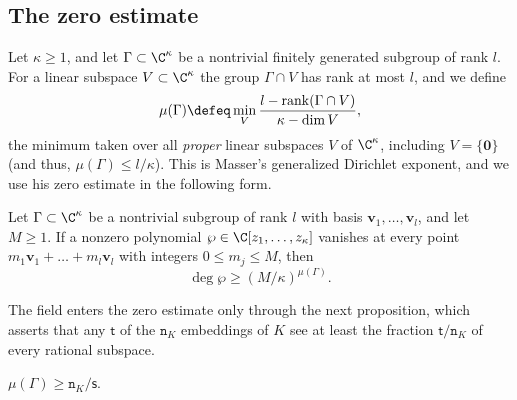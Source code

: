 \documentclass[11pt, reqno, twoside, letterpaper]{amsart}
\newcommand{\vv}{\mathbf{v}}
\newcommand{\vzero}{\mathbf{0}}
\DeclareMathOperator{\rk}{rank}
\newcommand{\dK}{{\mathtt{n}_K}}
\newcommand{\Kf}{K}
\newcommand{\lat}{\Gamma}
\newcommand{\poly}{\wp}
\newcommand{\nS}{\mathsf{s}}
\newcommand{\nT}{\mathsf{t}}
\begin{document}
\subsection{The zero estimate}

Let $\kappa\ge 1$, and let $\lat\subset\C^{\kappa}$ be a nontrivial
finitely generated subgroup of rank $l$. For a linear subspace
$V\subset\C^{\kappa}$ the group $\lat\cap V$ has rank at most $l$, and
we define
\[
\mu(\lat)\defeq\min_{V}\frac{l-\rk(\lat\cap V)}{\kappa-\dim V},
\]
the minimum taken over all \emph{proper} linear subspaces $V$ of
$\C^{\kappa}$, including $V=\{\vzero\}$ (and thus,
$\mu(\lat)\le l/\kappa$). This is Masser's generalized Dirichlet
exponent, and we use his zero estimate in the following form.

\begin{theorem}\label{thm:masser}
Let $\lat\subset\C^{\kappa}$ be a nontrivial subgroup of rank $l$ with
basis $\vv_1,\dots,\vv_l$, and let $M\ge 1$. If a nonzero polynomial
$\poly\in\C[z_1,\dots,z_\kappa]$ vanishes at every point
$m_1\vv_1+\dots+m_l\vv_l$ with integers $0\le m_j\le M$, then
\[
\deg \poly\ge(M/\kappa)^{\mu(\lat)}.
\]
\end{theorem}

The field enters the zero estimate only through the next
proposition, which
asserts that any $\nT$ of the $\dK$ embeddings of $\Kf$ see at least
the fraction $\nT/\dK$ of every rational subspace.

\begin{proposition}\label{prop:mu}
$\mu(\lat)\ge\dK/\nS$.
\end{proposition}
\end{document}
